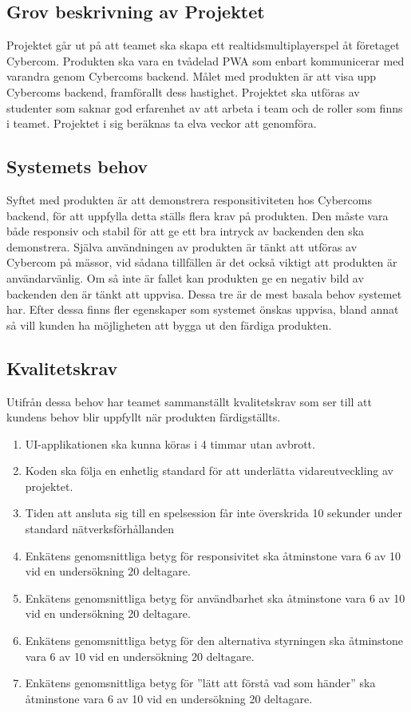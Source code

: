 \documentclass[10pt]{article}
\begin{document}
	\subsection{Grov beskrivning av Projektet}
	Projektet går ut på att teamet ska skapa ett realtidsmultiplayerspel åt företaget Cybercom. Produkten ska vara en tvådelad PWA som enbart kommunicerar med varandra genom Cybercoms backend. Målet med produkten är att visa upp Cybercoms backend, framförallt dess hastighet.
	Projektet ska utföras av studenter som saknar god erfarenhet av att arbeta i team och de roller som finns i teamet. Projektet i sig beräknas ta elva veckor att genomföra. 
	
	\subsection{Systemets behov}
	Syftet med produkten är att demonstrera responsitiviteten hos Cybercoms backend, för att uppfylla detta ställs flera krav på produkten. Den måste vara både responsiv och stabil för att ge ett bra intryck av backenden den ska demonstrera. Själva användningen av produkten är tänkt att utföras av Cybercom på mässor, vid sådana tillfällen är det också viktigt att produkten är användarvänlig. Om så inte är fallet kan produkten ge en negativ bild av backenden den är tänkt att uppvisa. Dessa tre är de mest basala behov systemet har. Efter dessa finns fler egenskaper som systemet önskas uppvisa, bland annat så vill kunden ha möjligheten att bygga ut den färdiga produkten.
	
	
	\subsection{Kvalitetskrav}
	Utifrån dessa behov har teamet sammanställt kvalitetskrav som ser till att kundens behov blir uppfyllt när produkten färdigställts.
	\begin{enumerate}
		\item UI-applikationen ska kunna köras i 4 timmar utan avbrott.
		\item Koden ska följa en enhetlig standard för att underlätta vidareutveckling av projektet.
		\item Tiden att ansluta sig till en spelsession får inte överskrida 10 sekunder under standard nätverksförhållanden
		\item Enkätens genomsnittliga betyg för responsivitet ska åtminstone vara 6 av 10 vid en undersökning 20 deltagare.
		\item Enkätens genomsnittliga betyg för användbarhet ska åtminstone vara 6 av 10 vid en undersökning 20 deltagare.
		\item Enkätens genomsnittliga betyg för den alternativa styrningen ska åtminstone vara 6 av 10 vid en undersökning 20 deltagare.
		\item Enkätens genomsnittliga betyg för ''lätt att förstå vad som händer'' ska åtminstone vara 6 av 10 vid en undersökning 20 deltagare.
		
	\end{enumerate}
\end{document}
